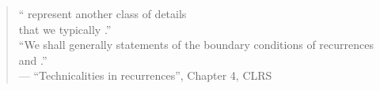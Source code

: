 
\begin{frame}{}
  \centerline{}

\end{frame}

% 

\begin{frame}{}

  \vspace{0.30cm}
  \centerline{}

  \pause
  \vspace{0.30cm}
  \begin{quote}
    \centering
    `` represent another class of details \\
    that we typically .''  \\[6pt]

    ``We shall generally  statements of the boundary conditions of recurrences 
    and .'' \\[6pt]

    \hfill --- ``Technicalities in recurrences'', Chapter 4, CLRS
  \end{quote}

  \pause
  \vspace{0.30cm}
  \centerline{}
\end{frame}

\begin{frame}{}
\end{frame}

